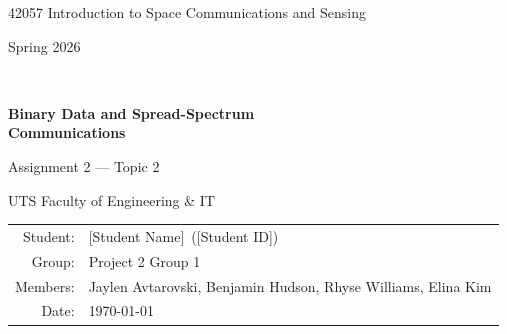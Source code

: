 \documentclass[11pt,a4paper]{article}
\newcommand{\studentname}{[Student Name]}
\newcommand{\studentid}{[Student ID]}
\newcommand{\groupname}{Project 2 Group 1}
\newcommand{\groupmembers}{Jaylen Avtarovski, Benjamin Hudson, Rhyse Williams, Elina Kim}
\begin{document}
\begin{titlepage}
  \centering
  
  {\large 42057 Introduction to Space Communications and Sensing\par}
  \vspace{0.3cm}
  {\large Spring 2026\par}
  \vspace{2cm}
  \\
  \vspace{3.5cm}
  {\Huge\bfseries Binary Data and Spread-Spectrum\\[0.2cm] Communications\par}
  \vspace{0.8cm}
  {\Large Assignment 2 --- Topic 2\par}
  \vspace{0.4cm}
  {\large UTS Faculty of Engineering \& IT\par}
  \vspace{7cm}
  \begin{tabular}{rl}
    Student: & \studentname\ (\studentid) \\
    Group:   & \groupname \\
    Members: & \groupmembers \\
    Date:    & \today
  \end{tabular}
  \vspace{2cm}
\end{titlepage}
\end{document}
